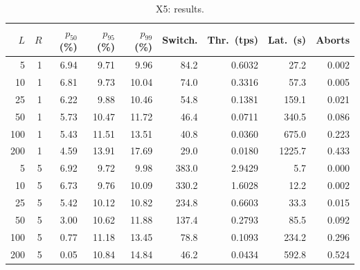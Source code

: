\begin{table}[!htb]
  \centering
  \captionsetup{format=plain,justification=centering}
  \caption{X5: results.}
  \label{tab:x5-resources}
  \small
  \setlength{\tabcolsep}{4pt}
  \renewcommand{\arraystretch}{0.92}
  \begin{tabular}{r r r r r r r r r}
    \toprule
    $L$     & $R$         & $p_{50}$ (\%) & $p_{95}$ (\%) & $p_{99}$ (\%) &
    Switch. & Thr.\ (tps) & Lat.\ (s)     & Aborts
    \\
    \midrule
    5       & 1           & 6.94          & 9.71          & 9.96          & 84.2
            & 0.6032      & 27.2          & 0.002
    \\
    10      & 1           & 6.81          & 9.73          & 10.04         & 74.0
            & 0.3316      & 57.3          & 0.005
    \\
    25      & 1           & 6.22          & 9.88          & 10.46         & 54.8
            & 0.1381      & 159.1         & 0.021
    \\
    50      & 1           & 5.73          & 10.47         & 11.72         & 46.4
            & 0.0711      & 340.5         & 0.086
    \\
    100     & 1           & 5.43          & 11.51         & 13.51         & 40.8
            & 0.0360      & 675.0         & 0.223
    \\
    200     & 1           & 4.59          & 13.91         & 17.69         & 29.0
            & 0.0180      & 1225.7        & 0.433
    \\
    \midrule
    5       & 5           & 6.92          & 9.72          & 9.98          & 383.0
            & 2.9429      & 5.7           & 0.000
    \\
    10      & 5           & 6.73          & 9.76          & 10.09         & 330.2
            & 1.6028      & 12.2          & 0.002
    \\
    25      & 5           & 5.42          & 10.12         & 10.82         & 234.8
            & 0.6603      & 33.3          & 0.015
    \\
    50      & 5           & 3.00          & 10.62         & 11.88         & 137.4
            & 0.2793      & 85.5          & 0.092
    \\
    100     & 5           & 0.77          & 11.18         & 13.45         & 78.8
            & 0.1093      & 234.2         & 0.296
    \\
    200     & 5           & 0.05          & 10.84         & 14.84         & 46.2
            & 0.0434      & 592.8         & 0.524

\end{tabular}
\end{table}
